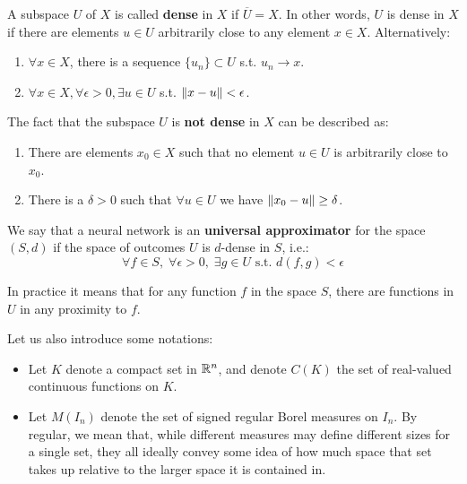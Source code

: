 \begin{definition}
    A subspace $U$ of $X$ is called \textbf{dense} in $X$ if $\overline{U} = X$. In other
    words, $U$ is dense in $X$ if there are elements $u \in U$ arbitrarily close to any
    element $x \in X$. Alternatively:
    \begin{enumerate}
        \item $\forall x \in X$, there is a sequence $\{u_n\} \subset U$ s.t. $u_n \to x$.
        \item $\forall x \in X, \forall \epsilon > 0, \exists u \in U$ s.t. $\left\|x - u\right\| < \epsilon$.
    \end{enumerate}
\end{definition}

The fact that the subspace $U$ is \textbf{not dense} in $X$ can be described as:
\begin{enumerate}
    \item There are elements $x_0 \in X$ such that no element $u \in U$ is arbitrarily close to $x_0$.
    \item There is a $\delta > 0$ such that $\forall u \in U$ we have $\left\|x_0 - u\right\| \geq \delta$.
\end{enumerate}

\begin{definition}
    We say that a neural network is an \textbf{universal approximator} for the space
    $(S, d)$ if the space of outcomes $U$ is $d$-dense in $S$, i.e.:
    $$\forall f \in S, \; \forall \epsilon > 0, \; \exists g \in U \text{ s.t. } d(f, g) < \epsilon$$

    In practice it means that for any function $f$ in the space $S$, there are functions in $U$ in
    any proximity to $f$.
\end{definition}

Let us also introduce some notations:
\begin{itemize}
    \item Let $K$ denote a compact set in $\mathbb{R}^n$, and denote $C(K)$ the set of real-valued
    continuous functions on $K$.

    \item Let $M(I_n)$ denote the set of signed regular Borel measures on $I_n$. By regular,
    we mean that, while different measures may define different sizes for a single set, they
    all ideally convey some idea of how much space that set takes up relative to the 
    larger space it is contained in.
\end{itemize}

